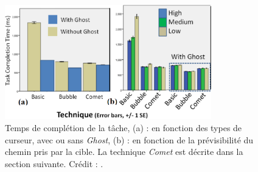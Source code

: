 	\begin{figure}[!htb]
		\centering
		\includegraphics[width=0.8\textwidth]{figures/ch2/cometGhostPredictability}
		\caption[\emph{Comet/Ghost}, prévisibilité et résultats]{Temps de complétion de la tâche, (a) : en fonction des types de curseur, avec ou sans \emph{Ghost}, (b) : en fonction de la prévisibilité du chemin pris par la cible. La technique \emph{Comet} est décrite dans la section suivante. Crédit : \cite{hasan2011comet}.}
		\label{fig:cometGhostPredictability}
	\end{figure}

